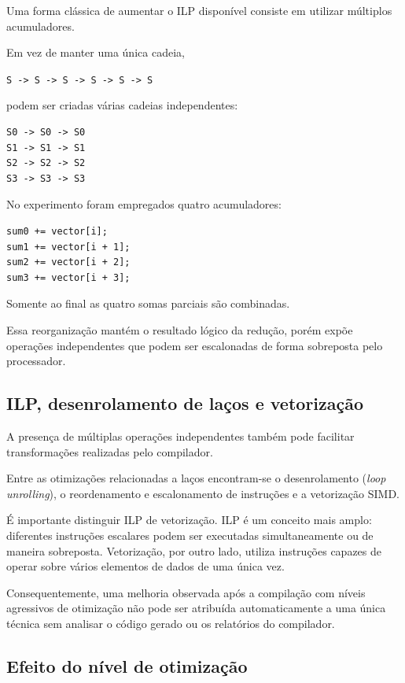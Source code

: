 Uma forma clássica de aumentar o ILP disponível consiste em utilizar múltiplos acumuladores.

Em vez de manter uma única cadeia,

\begin{center}
\texttt{S -> S -> S -> S -> S -> S}
\end{center}

podem ser criadas várias cadeias independentes:

\begin{verbatim}
S0 -> S0 -> S0
S1 -> S1 -> S1
S2 -> S2 -> S2
S3 -> S3 -> S3
\end{verbatim}

No experimento foram empregados quatro acumuladores:

\begin{verbatim}
sum0 += vector[i];
sum1 += vector[i + 1];
sum2 += vector[i + 2];
sum3 += vector[i + 3];
\end{verbatim}

Somente ao final as quatro somas parciais são combinadas.

Essa reorganização mantém o resultado lógico da redução, porém expõe operações independentes
que podem ser escalonadas de forma sobreposta pelo processador.


\subsection{ILP, desenrolamento de laços e vetorização}

A presença de múltiplas operações independentes também pode facilitar transformações
realizadas pelo compilador.

Entre as otimizações relacionadas a laços encontram-se o desenrolamento
(\textit{loop unrolling}), o reordenamento e escalonamento de instruções e a vetorização
SIMD.

É importante distinguir ILP de vetorização. ILP é um conceito mais amplo: diferentes
instruções escalares podem ser executadas simultaneamente ou de maneira sobreposta.
Vetorização, por outro lado, utiliza instruções capazes de operar sobre vários elementos
de dados de uma única vez.

Consequentemente, uma melhoria observada após a compilação com níveis agressivos de
otimização não pode ser atribuída automaticamente a uma única técnica sem analisar
o código gerado ou os relatórios do compilador.


\subsection{Efeito do nível de otimização}

